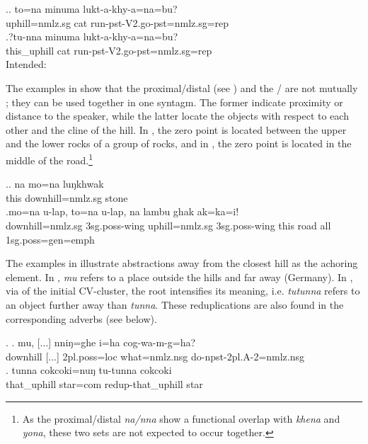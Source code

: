 \ex.\ag. to=na minuma lukt-a-khy-a=na=bu?\\
uphill{\sc =nmlz.sg} cat run{\sc [3sg]-pst-V2.go-pst=nmlz.sg=rep} \\
\bg.?tu-nna minuma lukt-a-khy-a=na=bu?\\
this\_uphill cat run{\sc [3sg]-pst-V2.go-pst=nmlz.sg=rep} \\
Intended: 
 
The examples in \Next show that the proximal/distal  (see  ) and the /  are not mutually ; they can be used together in one syntagm. The former indicate proximity or distance to the speaker, while the latter locate the objects with respect to each other and the cline of the hill. In \Next[a], the zero point is located between the upper and the lower rocks of a group of rocks, and in \Next[b], the zero point is located in the middle of the road.\footnote{As the proximal/distal  \emph{na/nna} show a functional overlap with \emph{khena} and \emph{yona}, these two sets are not expected to occur together.}

\ex.\ag.  na   mo=na  luŋkhwak\\
this downhill{\sc =nmlz.sg} stone\\
 
\bg.mo=na  u-lap,          to=na  u-lap,          na   lambu ghak ak=ka=i!\\
downhill{\sc =nmlz.sg} {\sc 3sg.poss-}wing uphill{\sc =nmlz.sg}  {\sc 3sg.poss-}wing this road all {\sc 1sg.poss=gen=emph} \\
  


The examples in \Next illustrate abstractions away from the closest hill as the achoring element. In \Next[a],  \emph{mu} refers to a place outside the hills and far away (Germany). In \Next[b], via  of the initial CV-cluster, the root  intensifies its meaning, i.e. \emph{tutunna} refers to an object further away than \emph{tunna}. These reduplications are also found in the corresponding adverbs (see  below). 

\ex. \ag. mu, [...] nniŋ=ghe i=ha cog-wa-m-g=ha?\\
	downhill [...] {\sc 2pl.poss=loc} what{\sc =nmlz.nsg} do{\sc -npst-2pl.A-2=nmlz.nsg}\\
	 
\bg. tunna cokcoki=nuŋ tu-tunna cokcoki\\
		that\_uphill star{\sc =com}	{\sc redup-}that\_uphill star\\


